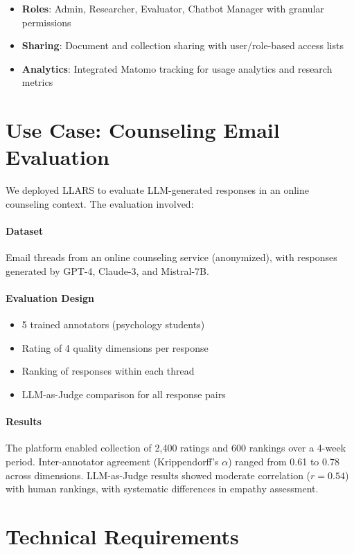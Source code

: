 \documentclass[11pt]{article}
\begin{document}
\begin{itemize}
    \item \textbf{Roles}: Admin, Researcher, Evaluator, Chatbot Manager with granular permissions
    \item \textbf{Sharing}: Document and collection sharing with user/role-based access lists
    \item \textbf{Analytics}: Integrated Matomo tracking for usage analytics and research metrics
\end{itemize}

\section{Use Case: Counseling Email Evaluation}

We deployed LLARS to evaluate LLM-generated responses in an online counseling context.
The evaluation involved:

\paragraph{Dataset}
Email threads from an online counseling service (anonymized), with responses generated by GPT-4, Claude-3, and Mistral-7B.

\paragraph{Evaluation Design}
\begin{itemize}
    \item 5 trained annotators (psychology students)
    \item Rating of 4 quality dimensions per response
    \item Ranking of responses within each thread
    \item LLM-as-Judge comparison for all response pairs
\end{itemize}

\paragraph{Results}
The platform enabled collection of 2,400 ratings and 600 rankings over a 4-week period.
Inter-annotator agreement (Krippendorff's $\alpha$) ranged from 0.61 to 0.78 across dimensions.
LLM-as-Judge results showed moderate correlation ($r = 0.54$) with human rankings, with systematic differences in empathy assessment.

\section{Technical Requirements}
\end{document}
